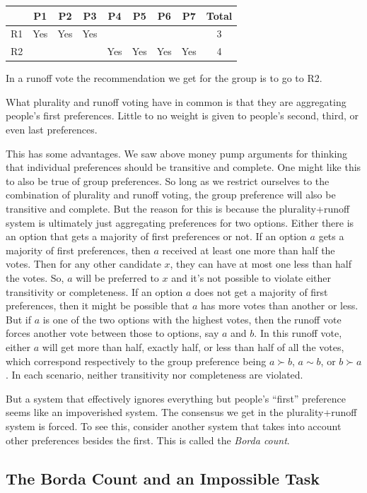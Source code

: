 \documentclass[]{tufte-book}
\begin{document}
\begin{longtable}[]{@{}lcccccccc@{}}
\toprule
& P1 & P2 & P3 & P4 & P5 & P6 & P7 & Total\tabularnewline
\midrule
\endhead
R1 & Yes & Yes & Yes & & & & & 3\tabularnewline
R2 & & & & Yes & Yes & Yes & Yes & 4\tabularnewline
\bottomrule
\end{longtable}

In a runoff vote the recommendation we get for the group is to go to R2.

What plurality and runoff voting have in common is that they are aggregating people's first preferences. Little to no weight is given to people's second, third, or even last preferences.

This has some advantages. We saw above money pump arguments for thinking that individual preferences should be transitive and complete. One might like this to also be true of group preferences. So long as we restrict ourselves to the combination of plurality and runoff voting, the group preference will also be transitive and complete. But the reason for this is because the plurality+runoff system is ultimately just aggregating preferences for two options. Either there is an option that gets a majority of first preferences or not. If an option \(a\) gets a majority of first preferences, then \(a\) received at least one more than half the votes. Then for any other candidate \(x\), they can have at most one less than half the votes. So, \(a\) will be preferred to \(x\) and it's not possible to violate either transitivity or completeness. If an option \(a\) does not get a majority of first preferences, then it might be possible that \(a\) has more votes than another or less. But if \(a\) is one of the two options with the highest votes, then the runoff vote forces another vote between those to options, say \(a\) and \(b\). In this runoff vote, either \(a\) will get more than half, exactly half, or less than half of all the votes, which correspond respectively to the group preference being \(a\succ b\), \(a\sim b\), or \(b\succ a\). In each scenario, neither transitivity nor completeness are violated.

But a system that effectively ignores everything but people's ``first'' preference seems like an impoverished system. The consensus we get in the plurality+runoff system is forced. To see this, consider another system that takes into account other preferences besides the first. This is called the \emph{Borda count}.

\hypertarget{the-borda-count-and-an-impossible-task}{%
\subsection{The Borda Count and an Impossible Task}\label{the-borda-count-and-an-impossible-task}}
\end{document}
